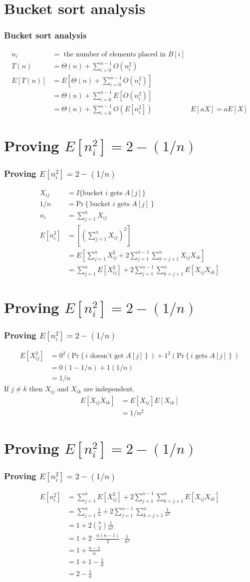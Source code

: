 \documentclass{beamer}
\newcommand{\pr}[1]{\ensuremath{\mbox{Pr}\left\{#1\right\}}}
\newcommand{\sect}[1]{
\section{#1}
\begin{frame}[fragile]\frametitle{#1}
}
\begin{document}
\sect{Bucket sort analysis}
\begin{align*}
  n_i &= \mbox{ the number of elements placed in } B[i]
  \\
  T(n) &= \Theta(n) + \sum_{i=0}^{n-1}O(n_i^2)
  \\
  E[T(n)] &= E\left[\Theta(n) + \sum_{i=0}^{n-1}O(n_i^2)\right]
  \\
  &= \Theta(n) + \sum_{i=0}^{n-1} E[O(n_i^2)]
  \\
  &= \Theta(n) + \sum_{i=0}^{n-1} O(E[n_i^2]) &E[aX] = aE[X]
\end{align*}

\end{frame}

\sect{Proving $E[n_i^2] = 2-(1/n)$}
\begin{align*}
  X_{ij} &= I\{\mbox{bucket $i$ gets $A[j]$}\}
  \\
   1/n &= \pr{\mbox{bucket $i$ gets $A[j]$}}
  \\
  n_i &= \sum_{j=1}^{n} X_{ij}
  \\
  E[n_i^2] &= \left[\left(\sum_{j=1}^{n} X_{ij}\right)^2\right]
  \\
  &= E\left[\sum_{j=1}^n X_{ij}^2 +
    2\sum_{j=1}^{n-1}\sum_{k=j+1}^nX_{ij}X_{ik}\right]
  \\
  &= \sum_{j=1}^n E[X_{ij}^2] +
    2\sum_{j=1}^{n-1}\sum_{k=j+1}^n E[X_{ij}X_{ik}]
\end{align*}

\end{frame}

\sect{Proving $E[n_i^2] = 2-(1/n)$}
\begin{align*}
  E[X_{ij}^2]
    &= 0^2(\pr{\mbox{$i$ doesn't get $A[j]$}}) +
  1^2(\pr{\mbox{$i$ gets $A[j]$}})
  \\
  &= 0(1-1/n) + 1(1/n)\\
  &= 1/n
\end{align*}
If $j\neq k$ then $X_{ij}$ and $X_{ik}$ are independent.
\begin{align*}
  E[X_{ij}X_{ik}] &=   E[X_{ij}]E[X_{ik}]
  \\
  &= 1/n^2
\end{align*}


\end{frame}

\sect{Proving $E[n_i^2] = 2-(1/n)$}
\begin{align*}
  E[n_i^2]  &= \sum_{j=1}^n E[X_{ij}^2] +
  2\sum_{j=1}^{n-1}\sum_{k=j+1}^n E[X_{ij}X_{ik}]
  \\
   &= \sum_{j=1}^n \frac{1}{n} +
  2\sum_{j=1}^{n-1}\sum_{k=j+1}^n \frac{1}{n^2}
  \\
  &= 1 + 2\binom{n}{2}\frac{1}{n^2}
  \\
  &= 1 + 2\cdot\frac{n(n-1)}{2}\cdot\frac{1}{n^2}
  \\
  &= 1 + \frac{n-1}{n}
  \\
  &= 1 + 1 - \frac{1}{n}
  \\
  &= 2 - \frac{1}{n}
\end{align*}
\end{frame}
\end{document}
